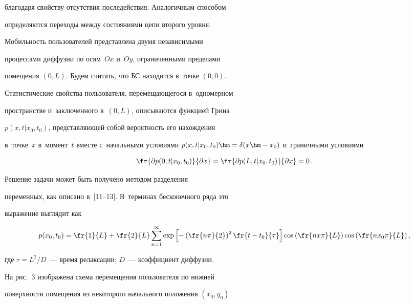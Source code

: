 благодаря свойству отсутствия последействия. Аналогичным способом 


определяются переходы между состояниями цепи второго уровня.


     


     Мобильность пользователей представлена двумя независимыми 


процессами диффузии по осям~$Ox$ и~$Oy$, ограниченными пределами 


помещения $(0,L)$. Будем считать, что БС находится в~точке $(0, 0)$. 


Статистические свойства пользователя, перемещающегося в~одномерном 


пространстве и~заключенного в~$(0,L)$, описываются функцией Грина 


$p(x,t\vert x_0,t_0)$, представляющей собой вероятность его нахождения 


в~точке~$x$ в~момент~$t$ вместе с~начальными условиями $p(x,t\vert x_0, 


t_0)\hm= \delta(x\hm-x_0)$ и~граничными условиями


     $$


     \fr{\partial p(0,t|x_0,t_0)}{\partial x} = \fr{\partial p(L,t|x_0,t_0)}{\partial x}=0\,.


     $$


     


     Решение задачи может быть получено методом разделения 


переменных, как описано в~[11--13]. В~терминах бесконечного ряда это 


выражение выглядит как


     $$


     p(x_0,t_0) =\fr{1}{L} +\fr{2}{L} \sum\limits_{n=1}^\infty \exp \left[ -\left( 


\fr{n\pi}{2}\right)^2 \fr{t-t_0}{\tau}\right] \cos \left( \fr{nx\pi}{L} \right) 


\cos\left( \fr{nx_0\pi}{L}\right),


     $$


где $\tau=L^2/D$~--- время релаксации; $D$~--- коэффициент диффузии.


     


     На рис.~3 изображена схема перемещения пользователя по нижней 


поверхности помещения из некоторого начального положения $(x_0, y_0)$ 


